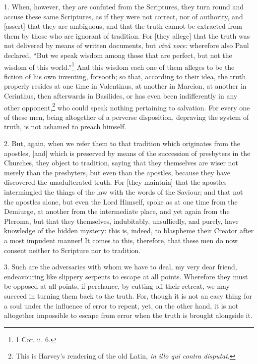 1. When, however, they are confuted from the Scriptures, they turn round and accuse these same Scriptures, as if they were not correct, nor of authority, and [assert] that they are ambiguous, and that the truth cannot be extracted from them by those who are ignorant of tradition. For [they allege] that the truth was not delivered by means of written documents, but \emph{vivâ voce: }wherefore also Paul declared, “But we speak wisdom among those that are perfect, but not the wisdom of this world.”\footnote{1 Cor. ii. 6.} And this wisdom each one of them alleges to be the fiction of his own inventing, forsooth; so that, according to their idea, the truth properly resides at one time in Valentinus, at another in Marcion, at another in Cerinthus, then afterwards in Basilides, or has even been indifferently in any other opponent,\footnote{This is Harvey’s rendering of the old Latin, \emph{in illo qui contra disputat}.} who could speak nothing pertaining to salvation. For every one of these men, being altogether of a perverse disposition, depraving the system of truth, is not ashamed to preach himself.

2. But, again, when we refer them to that tradition which originates from the apostles, [and] which is preserved by means of the succession of presbyters in the Churches, they object to tradition, saying that they themselves are wiser not merely than the presbyters, but even than the apostles, because they have discovered the unadulterated truth. For [they maintain] that the apostles intermingled the things of the law with the words of the Saviour; and that not the apostles alone, but even the Lord Himself, spoke as at one time from the Demiurge, at another from the intermediate place, and yet again from the Pleroma, but that they themselves, indubitably, unsulliedly, and purely, have knowledge of the hidden mystery: this is, indeed, to blaspheme their Creator after a most impudent manner! It comes to this, therefore, that these men do now consent neither to Scripture nor to tradition.

3. Such are the adversaries with whom we have to deal, my very dear friend, endeavouring like slippery serpents to escape at all points. Wherefore they must be opposed at all points, if perchance, by cutting off their retreat, we may succeed in turning them back to the truth. For, though it is not an easy thing for a soul under the influence of error to repent, yet, on the other hand, it is not altogether impossible to escape from error when the truth is brought alongside it.

